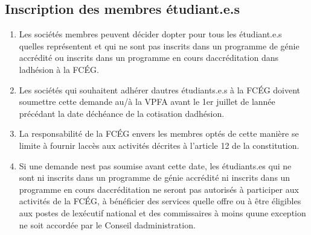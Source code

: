 \subsection{Inscription des membres étudiant.e.s}
\label{inscription-des-membres-etudiant-e-s}

\begin{enumerate}
 \item
  Les sociétés membres peuvent décider d\textquotesingle opter pour tous les étudiant.e.s qu\textquotesingle elles représentent et qui ne sont pas inscrits dans un programme de génie accrédité ou inscrits dans un programme en cours d\textquotesingle accréditation dans l\textquotesingle adhésion à la FCÉG.
 \item
  Les sociétés qui souhaitent adhérer d\textquotesingle autres étudiants.e.s à la FCÉG doivent soumettre cette demande au/à la VPFA avant le 1er juillet de l\textquotesingle année précédant la date d\textquotesingle échéance de la cotisation d\textquotesingle adhésion.
 \item
  La responsabilité de la FCÉG envers les membres optés de cette manière se limite à fournir l\textquotesingle accès aux activités décrites à l'article 12 de la constitution.
 \item
  Si une demande n\textquotesingle est pas soumise avant cette date, les étudiants.es qui ne sont ni inscrits dans un programme de génie accrédité ni inscrits dans un programme en cours d\textquotesingle accréditation ne seront pas autorisés à participer aux activités de la FCÉG, à bénéficier des services qu\textquotesingle elle offre ou à être éligibles aux postes de l\textquotesingle exécutif national et des commissaires à moins qu\textquotesingle une exception ne soit accordée par le Conseil d\textquotesingle administration.
\end{enumerate}

